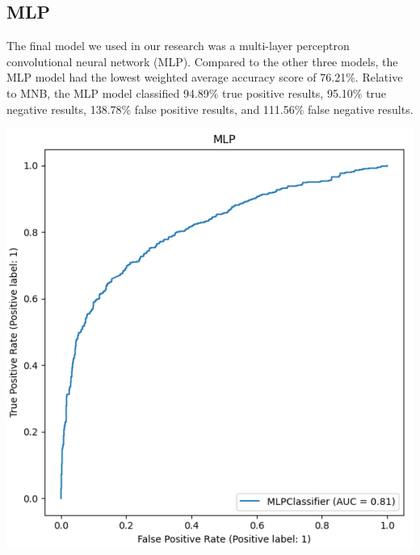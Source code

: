 \documentclass[11pt]{article}
\begin{document}
\subsection{MLP}

The final model we used in our research was a multi-layer perceptron convolutional neural network (MLP). Compared to the other three models, the MLP model had the lowest weighted average accuracy score of 76.21\%. Relative to MNB, the MLP model classified 94.89\% true positive results, 95.10\% true negative results, 138.78\% false positive results, and 111.56\% false negative results.

\begin{minipage}[t]{.45\linewidth}
\includegraphics[width=\linewidth]{images/mlp_plot.png}
\end{minipage}\hfill
\end{document}
